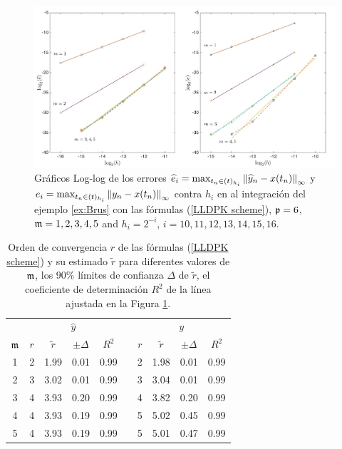 \begin{figure}[h]
	\begin{center}
		\includegraphics[scale=0.45]{Graphics/lldp/m-plots.jpg}
		\caption{Gráficos Log-log de los errores $\widehat{e}_i=\max_{t_n\in(t)_{h_i}}\left\lVert \widehat{y}_n-x(t_n) \right\rVert_\infty$ y $e_i=\max_{t_n\in(t)_{h_i}}\left\lVert y_n-x(t_n) \right\rVert_\infty$ contra $h_i$ en al integración del ejemplo \ref{ex:Brus} con las fórmulas (\ref{LLDPK scheme}), $\mathfrak{p}=6$, $\mathfrak{m}=1,2,3,4,5$ and $h_i=2^{-i}$, $i=10,11,12,13,14,15,16$.}
		\label{fig:num-exp-lldp-fix-step:Fig3}
	\end{center}
\end{figure}

\begin{table}[h]
	\centering
	\caption{
        Orden de convergencia $r$ de las fórmulas (\ref{LLDPK scheme}) y su estimado  $\widetilde{r}$ para diferentes valores de $\mathfrak{m}$, los $90\%$ límites de confianza $\Delta$ de $\widetilde {r}$, el coeficiente de determinación $R^2$ de la línea ajustada en la Figura \ref{fig:num-exp-lldp-fix-step:Fig3}.}
		\begin{tabular}{ c  c c c c  c  c c c c}
			\hline
			& \multicolumn{4}{c}{$\widehat{y}$} & & \multicolumn{4}{c}{$y$} \\
			\cline{2-5} \cline{7-10}
			$\mathfrak{m}$ & $r$ & $\widetilde{r}$ & $\pm\varDelta$ & $R^2$ & & $r$ & $\widetilde{r}$ & $\pm\varDelta$ & $R^2$ \\
			\hline
			1 & 2 & 1.99 & 0.01 & 0.99 & & 2 & 1.98 & 0.01 & 0.99 \\
			2 & 3 & 3.02 & 0.01 & 0.99 & & 3 & 3.04 & 0.01 & 0.99 \\
			3 & 4 & 3.93 & 0.20 & 0.99 & & 4 & 3.82 & 0.20 & 0.99 \\
			4 & 4 & 3.93 & 0.19 & 0.99 & & 5 & 5.02 & 0.45 & 0.99 \\
			5 & 4 & 3.93 & 0.19 & 0.99 & & 5 & 5.01 & 0.47 & 0.99 \\
			\hline
		\end{tabular}
	\label{tab:num-exp-lldp-fix-step:morders}
\end{table}

